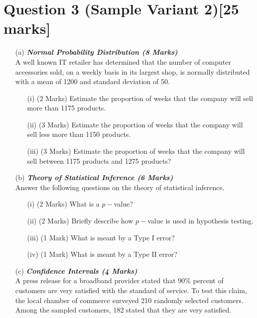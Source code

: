 \documentclass[]{article}
\begin{document}
\section*{Question 3 (Sample Variant 2)[25 marks]}
\begin{itemize}
\item[(a)] \textbf{\textit{Normal Probability Distribution (8 Marks)}}\\
A well known IT retailer has determined that the number of computer accessories sold, on a weekly basis in its largest shop, is normally distributed with a mean of 1200 and standard deviation of 50.
\begin{itemize}
\item[(i)] (2 Marks) Estimate the proportion of weeks that the company will sell more than 1175 products.

\item[(ii)] (3 Marks) Estimate the proportion of weeks that the company will sell less more than 1150 products.
\item[(iii)] (3 Marks) Estimate the proportion of weeks that the company will sell between 1175
products and 1275 products?
\end{itemize}

\item[(b)] \textbf{\textit{Theory of Statistical Inference (6 Marks)}}\\Answer the following questions on the theory of statistical inference.
\begin{itemize}
\item[(i)] (2 Marks) What is a $p-$value?
\item[(ii)] (2 Marks) Briefly describe how $p-$value is used in hypothesis testing.
\item[(iii)] (1 Mark) What is meant by a Type I error?
\item[(iv)] (1 Mark) What is meant by a Type II error?
\end{itemize}
\bigskip

\item[(c)] \textbf{\textit{Confidence Intervals (4 Marks)}}\\
A press release for a broadband provider stated that $90\%$ percent of customers are very satisfied
with the standard of service. To test this claim, the local chamber of commerce surveyed 210 randomly selected customers. Among the sampled customers, 182 stated that they are very satisfied.



\end{itemize}
\end{document}
